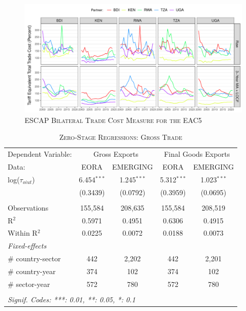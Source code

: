 \documentclass[a4paper]{article}
\begin{document}
\begin{figure}[h!] \vspace{-0.5cm}
\centering
\caption{\label{fig:ESCAP_EAC}\textsc{ESCAP Bilateral Trade Cost Measure for the EAC5}}
\includegraphics[width=1\textwidth]{"ESCAP_EAC5_Trade_Costs.pdf"} \vspace{-1cm}
\end{figure}
\FloatBarrier


\begin{table}[h!]
   \caption{\label{tab:ZS_GT_FULL} \textsc{Zero-Stage Regressions: Gross Trade}}
   \centering
   \begin{tabular}{lcccc}
      \tabularnewline \toprule
      Dependent Variable: & \multicolumn{2}{c}{Gross Exports} & \multicolumn{2}{c}{Final Goods Exports} \\ \cmidrule(lr){2-5}
      Data:                               & EORA           & EMERGING        & EORA           & EMERGING \\   
      \midrule
      log($\tau_{oiut}$)      & 6.454$^{***}$ & 1.245$^{***}$ & 5.312$^{***}$ & 1.023$^{***}$\\  
                                   & (0.3439)      & (0.0792)    & (0.3959)      & (0.0695)\\ \\   
      Observations                 & 155,584       & 208,635       & 155,584       & 208,519\\  
      R$^2$                        & 0.5971        & 0.4951        & 0.6306        & 0.4915\\  
      Within R$^2$                 & 0.0225        & 0.0072        & 0.0188        & 0.0073\\     
      \midrule
      \emph{Fixed-effects}  \\
     \# country-sector            & 442           & 2,202         & 442           & 2,201\\  
      \# country-year              & 374           & 102           & 374           & 102\\  
      \# sector-year               & 572           & 780           & 572           & 780\\  
      \bottomrule \\ [-0.9em]
      \multicolumn{5}{l}{\emph{Signif. Codes: ***: 0.01, **: 0.05, *: 0.1}}\\
   \end{tabular}
   \vspace{-0.5cm}
\end{table}
\FloatBarrier
\end{document}
